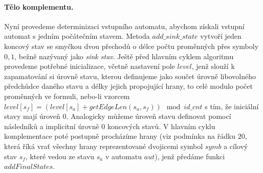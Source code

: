 \paragraph{Tělo komplementu.} Nyní provedeme determinizaci vstupního automatu, abychom získali vstupní automat s jedním počátečním stavem. Metoda $add\_sink\_state$ vytvoří jeden koncový stav se smyčkou dvou přechodů o délce počtu proměnných přes symboly $0,1$, bežně nazývaný jako \textit{sink stav}. Ještě před hlavním cyklem algoritmu provedeme potřebné inicializace, včetně nastavení pole $level$, jenž slouží k zapamatování si úrovně stavu, kterou definujeme jako součet úrovně libovolného předchůdce daného stavu a délky jejich propojující hrany, to celé modulo počet proměnných ve formuli, nebo-li vzorcem $level[s_f] = (level[s_a] + getEdgeLen(s_a,s_f)) \mod id\_cnt$ s tím, že iniciální stavy mají úroveň $0$. Analogicky můžeme úroveň stavu definovat pomocí následníků a implicitní úrovně $0$ koncových stavů. V hlavním cyklu komplementace poté postupně procházíme hrany (viz podmínka na řádku $20$, která říká vrať všechny hrany reprezentované dvojicemi symbol $symb$ a cílový stav $s_f$, které vedou ze stavu $s_a$ v automatu $aut$), jenž předáme funkci $addFinalStates$. 

